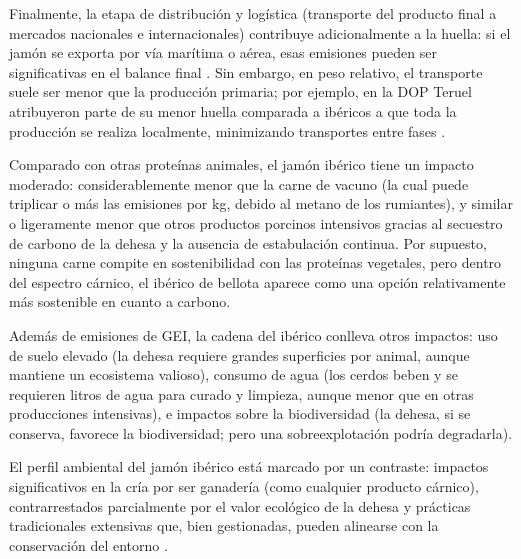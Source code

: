 Finalmente, la etapa de distribución y logística (transporte del producto final a mercados nacionales e internacionales) contribuye adicionalmente a la huella: si el jamón se exporta por vía marítima o aérea, esas emisiones pueden ser significativas en el balance final \cite{noauthor_huella_2025}. Sin embargo, en peso relativo, el transporte suele ser menor que la producción primaria; por ejemplo, en la DOP Teruel atribuyeron parte de su menor huella comparada a ibéricos a que toda la producción se realiza localmente, minimizando transportes entre fases \cite{noauthor_producir_nodate}.

Comparado con otras proteínas animales, el jamón ibérico tiene un impacto moderado: considerablemente menor que la carne de vacuno (la cual puede triplicar o más las emisiones por kg, debido al metano de los rumiantes), y similar o ligeramente menor que otros productos porcinos intensivos gracias al secuestro de carbono de la dehesa y la ausencia de estabulación continua. Por supuesto, ninguna carne compite en sostenibilidad con las proteínas vegetales, pero dentro del espectro cárnico, el ibérico de bellota aparece como una opción relativamente más sostenible en cuanto a carbono.

Además de emisiones de GEI, la cadena del ibérico conlleva otros impactos: uso de suelo elevado (la dehesa requiere grandes superficies por animal, aunque mantiene un ecosistema valioso), consumo de agua (los cerdos beben y se requieren litros de agua para curado y limpieza, aunque menor que en otras producciones intensivas), e impactos sobre la biodiversidad (la dehesa, si se conserva, favorece la biodiversidad; pero una sobreexplotación podría degradarla).

El perfil ambiental del jamón ibérico está marcado por un contraste: impactos significativos en la cría por ser ganadería (como cualquier producto cárnico), contrarrestados parcialmente por el valor ecológico de la dehesa y prácticas tradicionales extensivas que, bien gestionadas, pueden alinearse con la conservación del entorno \cite{noauthor_huella_2025}.

